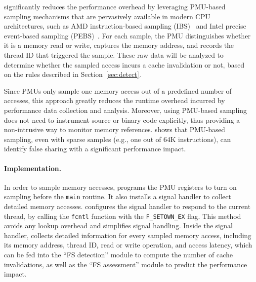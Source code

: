 \cheetah{} significantly reduces the performance overhead by leveraging PMU-based sampling mechanisms that are pervasively available in modern CPU architectures, such as AMD instruction-based sampling (IBS)~\cite{AMDIBS:07} and Intel precise event-based sampling (PEBS)~\cite{IntelArch:PEBS:Sept09}. For each sample, the PMU distinguishes whether it is a memory read or write, captures the memory address, and records the thread ID that triggered the sample. These raw data will be analyzed to determine whether the sampled access incurs a cache invalidation or not, based on the rules described in Section~\ref{sec:detect}.

Since PMUs only sample one memory access out of a predefined number of accesses, this approach greatly reduces the runtime overhead incurred by performance data collection and analysis. Moreover, using PMU-based sampling does not need to instrument source or binary code explicitly, thus providing a non-intrusive way to monitor memory references. \cheetah{} shows that PMU-based sampling, even with sparse samples (e.g., one out of 64K instructions), can identify false sharing with a significant performance impact.
 

\paragraph{Implementation.} 

In order to sample memory accesses, \cheetah{} programs the PMU registers to turn on sampling before the \texttt{main} routine. It also installs a signal handler to collect detailed memory accesses. \Cheetah{} configures the signal handler to respond to the current thread, by calling the \texttt{fcntl} function with the \texttt{F\_SETOWN\_EX} flag. This method avoids any lookup overhead and simplifies signal handling. Inside the signal handler, \Cheetah{} collects detailed information for every sampled memory access, including its memory address, thread ID, read or write operation, and access latency, which can be fed into the ``FS detection'' module to compute the number of cache invalidations, as well as the ``FS assessment'' module to predict the performance impact.


